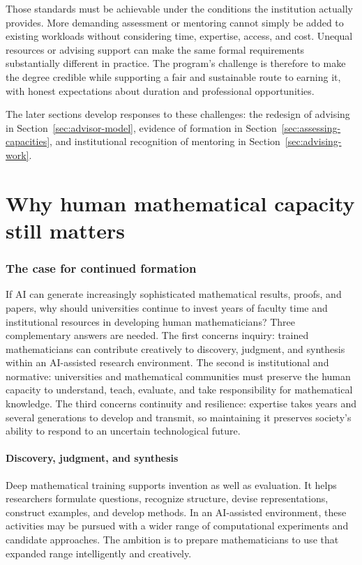 \documentclass[11pt]{article}
\begin{document}
Those standards must be achievable under the conditions the institution actually
provides. More demanding assessment or mentoring cannot simply be added to existing
workloads without considering time, expertise, access, and cost. Unequal resources or
advising support can make the same formal requirements substantially different in
practice. The program's challenge is therefore to make the degree credible while
supporting a fair and sustainable route to earning it, with honest expectations about
duration and professional opportunities.

The later sections develop responses to these challenges: the redesign of advising in
Section~\ref{sec:advisor-model}, evidence of formation in
Section~\ref{sec:assessing-capacities}, and institutional recognition of mentoring in
Section~\ref{sec:advising-work}.

\clearpage
\part{Why human mathematical capacity still matters}

\section{The case for continued formation}

If AI can generate increasingly sophisticated mathematical results, proofs, and papers,
why should universities continue to invest years of faculty time and institutional
resources in developing human mathematicians?  Three complementary answers are needed.
The first concerns inquiry: trained mathematicians can contribute creatively to
discovery, judgment, and synthesis within an AI-assisted research environment.  The second is institutional and
normative: universities and mathematical communities must preserve the human capacity to
understand, teach, evaluate, and take responsibility for mathematical knowledge.  The
third concerns continuity and resilience: expertise takes years and several generations
to develop and transmit, so maintaining it preserves society's ability to respond to an
uncertain technological future.

\subsection{Discovery, judgment, and synthesis}

Deep mathematical training supports invention as well as evaluation. It helps researchers
formulate questions, recognize structure, devise representations, construct examples,
and develop methods. In an AI-assisted environment, these activities may be pursued with
a wider range of computational experiments and candidate approaches. The ambition is to
prepare mathematicians to use that expanded range intelligently and creatively.
\end{document}
